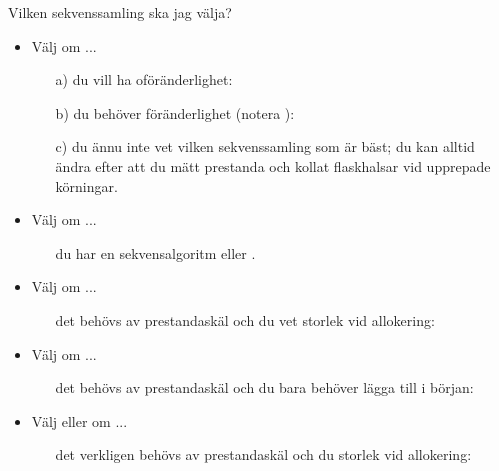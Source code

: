 \begin{Slide}{Vilken sekvenssamling ska jag välja?}\SlideFontSmall
\vspace{-0.5em}
\begin{itemize}
\item Välj  om ...
  \begin{itemize}\SlideFontTiny
  \item[a)] du vill ha oföränderlighet: 
  \item[b)] du behöver föränderlighet (notera ):\\ 
  \item[c)] du ännu inte vet vilken sekvenssamling som är bäst; du kan alltid ändra efter att du mätt prestanda och kollat flaskhalsar vid upprepade körningar.
  \end{itemize}

\item Välj  om ...
  \begin{itemize}\SlideFontTiny
  \item[] du har en  sekvensalgoritm eller .
  \end{itemize}

\item Välj  om ...
  \begin{itemize}\SlideFontTiny
  \item[] det behövs av prestandaskäl och du  vet storlek vid allokering:\\
  \end{itemize}

\item Välj  om ...
  \begin{itemize}\SlideFontTiny
  \item[] det behövs av prestandaskäl och du bara behöver lägga till i början:\\ 
  \end{itemize}

\item Välj  eller  om ...
  \begin{itemize}\SlideFontTiny
  \item[] det verkligen behövs av prestandaskäl och du  storlek vid allokering:\\
  \end{itemize}

\end{itemize}
\end{Slide}

